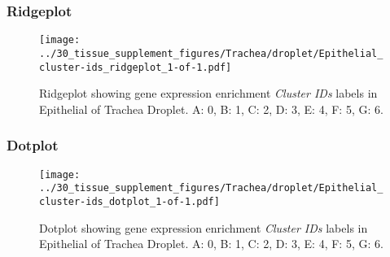 \clearpage

\subsubsection{Ridgeplot}
\begin{figure}[h]
\centering
\texttt{[image: ../30\_tissue\_supplement\_figures/Trachea/droplet/Epithelial\_cluster-ids\_ridgeplot\_1-of-1.pdf]}

\caption{ Ridgeplot  showing gene expression enrichment \emph{Cluster IDs} labels in Epithelial of Trachea Droplet. A: 0, B: 1, C: 2, D: 3, E: 4, F: 5, G: 6.}
\end{figure}


\clearpage

\subsubsection{Dotplot}
\begin{figure}[h]
\centering
\texttt{[image: ../30\_tissue\_supplement\_figures/Trachea/droplet/Epithelial\_cluster-ids\_dotplot\_1-of-1.pdf]}

\caption{ Dotplot  showing gene expression enrichment \emph{Cluster IDs} labels in Epithelial of Trachea Droplet. A: 0, B: 1, C: 2, D: 3, E: 4, F: 5, G: 6.}
\end{figure}

